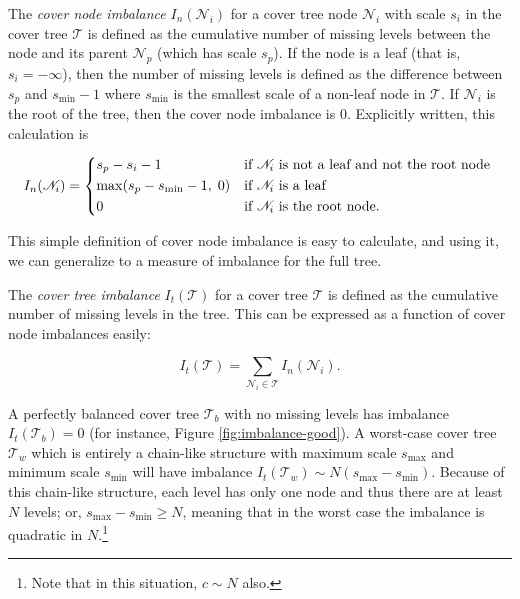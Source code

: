 \begin{defn}
The {\it cover node imbalance} $I_n(\mathscr{N}_i)$ for a cover tree node
$\mathscr{N}_i$ with scale $s_i$ in the cover tree $\mathscr{T}$ is defined as
the cumulative number of missing levels between the node and its parent
$\mathscr{N}_p$ (which has scale $s_p$).  If
the node is a leaf (that is, $s_i = -\infty$), then the number of missing
levels is defined as the difference between $s_p$ and $s_{\min} - 1$ where
$s_{\min}$ is the smallest scale of a non-leaf node in $\mathscr{T}$.  If
$\mathscr{N}_i$ is the root of the tree, then the cover node imbalance is 0.
Explicitly written, this calculation is

\begin{equation}
I_n(\mathscr{N}_i) = \begin{dcases*}
  s_p - s_i - 1 & if $\mathscr{N}_i$ is not a leaf and not the root node \\
  \max(s_p - s_{\min} - 1, \; 0) & if $\mathscr{N}_i$ is a leaf \\
  0 & if $\mathscr{N}_i$ is the root node.
  \end{dcases*}
  \label{eqn_node_imbalance}
\end{equation}
\end{defn}

This simple definition of cover node imbalance is easy to calculate, and using
it, we can generalize to a measure of imbalance for the full tree.

\begin{defn}
\label{def:imbalance}
The {\it cover tree imbalance} $I_t(\mathscr{T})$ for a cover tree $\mathscr{T}$
is defined as the cumulative number of missing levels in the tree.  This can be
expressed as a function of cover node imbalances easily:

\begin{equation}
I_t(\mathscr{T}) = \sum_{\mathscr{N}_i \in \mathscr{T}} I_n(\mathscr{N}_i).
\end{equation}
\end{defn}

A perfectly balanced cover tree $\mathscr{T}_b$ with no missing levels has
imbalance $I_t(\mathscr{T}_b) = 0$ (for instance, Figure
\ref{fig:imbalance-good}).  A worst-case cover tree $\mathscr{T}_w$ which is
entirely a chain-like structure with maximum scale $s_{\max}$ and minimum scale
$s_{\min}$ will have imbalance $I_t(\mathscr{T}_w) \sim N (s_{\max} -
s_{\min})$.  Because of this chain-like structure, each level has only one node
and thus there are at least $N$ levels; or, $s_{\max} - s_{\min} \ge N$, meaning
that in the worst case the imbalance is quadratic in $N$.\footnote{Note that in
this situation, $c \sim N$ also.}

